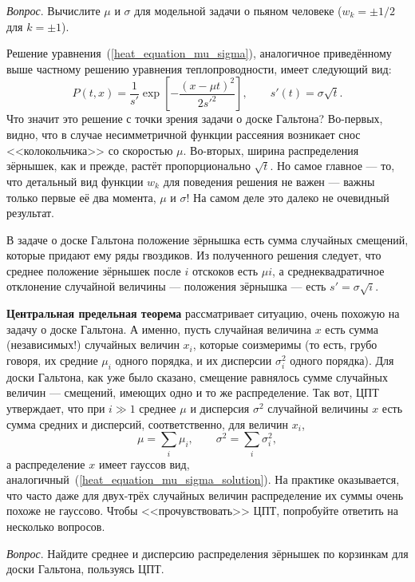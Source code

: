 \documentclass{book}
\begin{document}
\textit{Вопрос}. Вычислите $\mu$ и $\sigma$ для модельной задачи о пьяном человеке ($w_k = \pm 1/2$
для $k = \pm 1$).

Решение уравнения~(\ref{heat_equation_mu_sigma}), аналогичное приведённому выше частному решению
уравнения теплопроводности, имеет следующий вид:
\begin{equation}
    \label{heat_equation_mu_sigma_solution}
    P(t, x) = \frac{1}{s'} \exp \left[-\frac{(x - \mu t)^2}{2 s'^2} \right], \qquad s'(t) = \sigma
    \sqrt{t}.
\end{equation}
Что значит это решение с точки зрения задачи о доске Гальтона? Во-первых, видно, что в случае
несимметричной функции рассеяния возникает снос <<колокольчика>> со скоростью $\mu$. Во-вторых,
ширина распределения зёрнышек, как и прежде, растёт пропорционально $\sqrt{t}$.
Но самое главное --- то, что детальный вид функции $w_k$ для поведения решения не важен --- важны
только первые её два момента, $\mu$ и $\sigma$! На самом деле это далеко не очевидный результат.

В задаче о доске Гальтона положение зёрнышка есть сумма случайных смещений, которые придают ему
ряды гвоздиков. Из полученного решения следует, что среднее положение зёрнышек после $i$ отскоков
есть $\mu i$, а среднеквадратичное отклонение случайной величины --- положения зёрнышка ---
есть $s' = \sigma \sqrt{i}$.

\textbf{Центральная предельная теорема} рассматривает ситуацию, очень похожую на задачу о доске
Гальтона. А именно, пусть случайная величина $x$ есть сумма (независимых!) случайных величин $x_i$,
которые соизмеримы (то есть, грубо говоря, их средние $\mu_i$ одного порядка, и их дисперсии
$\sigma_i^2$ одного порядка). Для доски Гальтона, как уже было сказано, смещение равнялось сумме
случайных величин --- смещений, имеющих одно и то же распределение. Так вот, ЦПТ утверждает, что при $i \gg 1$
среднее $\mu$ и дисперсия $\sigma^2$ случайной величины $x$ есть сумма средних и дисперсий,
соответственно, для величин $x_i$,
\begin{equation}
    \mu = \sum_i \mu_i, \qquad \sigma^2 = \sum_i \sigma_i^2,
\end{equation}
а распределение $x$ имеет гауссов вид, аналогичный~(\ref{heat_equation_mu_sigma_solution}). На
практике оказывается, что часто даже для двух-трёх случайных величин распределение их суммы очень
похоже не гауссово. Чтобы <<прочувствовать>> ЦПТ, попробуйте ответить на несколько вопросов.

\textit{Вопрос}. Найдите среднее и дисперсию распределения зёрнышек по корзинкам для доски
Гальтона, пользуясь ЦПТ.
\end{document}
